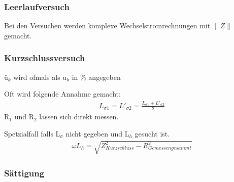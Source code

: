 \subsubsection{Leerlaufversuch}
Bei den Versuchen werden komplexe Wechselstromrechnungen mit $\|Z\|$ gemacht.

\subsubsection{Kurzschlussversuch}
ü$_k$ wird ofmals als u$_k$ in \% angegeben\par
Oft wird folgende Annahme gemacht:
\begin{gather*}
L_{\sigma 1} = L'_{\sigma 2} = \frac{L_{\sigma 1} + L'_{\sigma 2}}{2}
\end{gather*}
R$_1$ und R$_2$ lassen sich direkt messen.\par
Spetzialfall falls L$_\sigma$ nicht gegeben und L$_h$ gesucht ist.
\begin{gather*}
\omega L_h = \sqrt{Z_{Kurzschluss}^2 - R_{Gemessengesammt}^2}
\end{gather*}

\columnbreak
\subsubsection{Sättigung}
